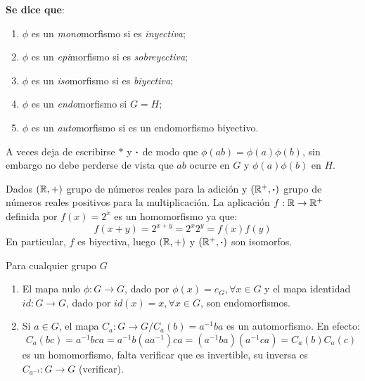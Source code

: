 \textbf{Se dice que}:
\begin{enumerate}[label=\roman*)]
	\item $\phi$ es un \textit{mono}morfismo si es \textit{inyectiva};
	\item $\phi$ es un \textit{epi}morfismo si es \textit{sobreyectiva};
	\item $\phi$ es un \textit{iso}morfismo si es \textit{biyectiva};
	\item $\phi$ es un \textit{endo}morfismo si $G = H$;
	\item $\phi$ es un \textit{auto}morfismo si es un endomorfismo biyectivo.
\end{enumerate}
A veces deja de escribirse $*$ y $\boldsymbol{\cdot}$ de modo que $\phi(ab) = \phi(a)\phi(b)$, sin embargo no debe perderse de vista que $ab$ ocurre en $G$ y $\phi(a)\phi(b)$ en $H$.

\begin{fmd-example}
	Dados $(\mathbb{R}, +)$ grupo de números reales para la adición y $(\mathbb{R}^+, \boldsymbol{\cdot})$ grupo de números reales positivos para la multiplicación. La aplicación $f: \mathbb{R} \rightarrow \mathbb{R}^+$ definida por $f(x) = 2^x$ es un homomorfismo ya que:
	\[ f(x + y) = 2^{x + y} = 2^x 2^y = f(x)f(y)\]
	En particular, $f$ es biyectiva, luego $(\mathbb{R}, +)$ y $(\mathbb{R}^+, \boldsymbol{\cdot})$ son isomorfos.
\end{fmd-example}

\begin{fmd-example}
	Para cualquier grupo $G$
	
	\begin{enumerate}
		\item El mapa nulo $\phi: G \rightarrow G$, dado por $\phi(x) = e_G, \forall x \in G$ y el mapa identidad $id: G \rightarrow G$, dado por $id(x) = x, \forall x \in G$, son endomorfismos.
		\item Si $a\in G$, el mapa $C_a: G \rightarrow G / C_a(b) = a^{-1}ba$ es un automorfismo. En efecto: \vspace{-1mm}
		\[ C_a(bc) = a^{-1}bca = a^{-1}b (aa^{-1}) ca = (a^{-1}ba)(a^{-1} ca) = C_a(b)C_a(c)\]
		es un homomorfismo, falta verificar que es invertible, su inversa es $C_{a^{-1}}: G \rightarrow G$ (verificar).
	\end{enumerate}
\end{fmd-example}

